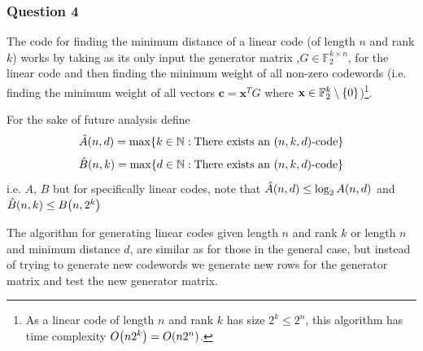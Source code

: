 \documentclass[11pt]{article} %
\let\originalleft\left
\let\originalright\right
\renewcommand{\left}{\mathopen{}\mathclose\bgroup\originalleft}
\renewcommand{\right}{\aftergroup\egroup\originalright}
\begin{document}
\subsubsection*{Question 4}

The code for finding the minimum distance of a linear code (of length $n$ and rank $k$) works by taking as its only input the generator matrix ,$G\in\mathbb{F}_2^{k\times n}$, for the linear code and then finding the minimum weight of all non-zero codewords (i.e. finding the minimum weight of all vectors $\mathbf{c} = \mathbf{x}^TG$ where $\mathbf{x} \in \mathbb{F}_2^k\setminus\left\{0\right\}$)\footnote{As a linear code of length $n$ and rank $k$ has size $2^k \leq 2^n$, this algorithm has time complexity $O\left(n2^k\right) = O\left(n2^n\right)$.}.

For the sake of future analysis define
\begin{equation*}
	\hat{A}\left(n, d\right) = \max\left\{k \in \mathbb{N} : \text{There exists an } \left(n, k, d\right) \text{-code} \right\}
\end{equation*}
\begin{equation*}
	\hat{B}\left(n, k\right) = \max\left\{d \in \mathbb{N} : \text{There exists an } \left(n, k, d\right) \text{-code} \right\}
\end{equation*}
i.e. $A$, $B$ but for specifically linear codes, note that $\hat{A}\left(n, d\right) \leq \log_2 A\left(n, d\right)$ and $\hat{B}\left(n, k\right) \leq B\left(n, 2^k\right)$


The algorithm for generating linear codes given length $n$ and rank $k$ or length $n$ and minimum distance $d$, are similar as for those in the general case, but instead of trying to generate new codewords we generate new rows for the generator matrix and test the new generator matrix.
\end{document}
